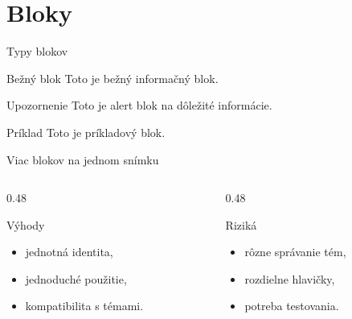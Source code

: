 \documentclass[aspectratio=169]{beamer}
\begin{document}
	\section{Bloky}
	
	\begin{frame}{Typy blokov}
		\begin{block}{Bežný blok}
			Toto je bežný informačný blok.
		\end{block}
		
		\begin{alertblock}{Upozornenie}
			Toto je alert blok na dôležité informácie.
		\end{alertblock}
		
		\begin{exampleblock}{Príklad}
			Toto je príkladový blok.
		\end{exampleblock}
	\end{frame}
	
	\begin{frame}{Viac blokov na jednom snímku}
		\begin{columns}
			
			\begin{column}{0.48\textwidth}
				\begin{block}{Výhody}
					\begin{itemize}
						\item jednotná identita,
						\item jednoduché použitie,
						\item kompatibilita s témami.
					\end{itemize}
				\end{block}
			\end{column}
			
			\begin{column}{0.48\textwidth}
				\begin{alertblock}{Riziká}
					\begin{itemize}
						\item rôzne správanie tém,
						\item rozdielne hlavičky,
						\item potreba testovania.
					\end{itemize}
				\end{alertblock}
			\end{column}
			
		\end{columns}
	\end{frame}
	
\end{document}
